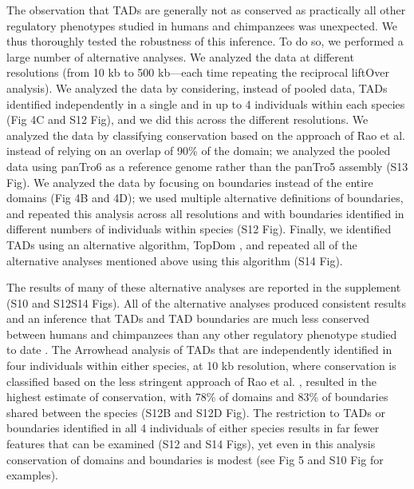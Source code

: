 The observation that TADs are generally not as conserved as practically all other regulatory phenotypes studied in humans and chimpanzees was unexpected. We thus thoroughly tested the robustness of this inference. To do so, we performed a large number of alternative analyses. We analyzed the data at different resolutions (from 10 kb to 500 kb---each time repeating the reciprocal liftOver analysis). We analyzed the data by considering, instead of pooled data, TADs identified independently in a single and in up to 4 individuals within each species (Fig 4C and S12 Fig), and we did this across the different resolutions. We analyzed the data by classifying conservation based on the approach of Rao et al. \cite{Rao.2014} instead of relying on an overlap of 90\% of the domain; we analyzed the pooled data using panTro6 as a reference genome rather than the panTro5 assembly (S13 Fig). We analyzed the data by focusing on boundaries instead of the entire domains (Fig 4B and 4D); we used multiple alternative definitions of boundaries, and repeated this analysis across all resolutions and with boundaries identified in different numbers of individuals within species (S12 Fig). Finally, we identified TADs using an alternative algorithm, TopDom \cite{Shin.2016}, and repeated all of the alternative analyses mentioned above using this algorithm (S14 Fig).

The results of many of these alternative analyses are reported in the supplement (S10 and S12{\textendash}S14 Figs). All of the alternative analyses produced consistent results and an inference that TADs and TAD boundaries are much less conserved between humans and chimpanzees than any other regulatory phenotype studied to date \cite{Pai.2011, Shulha.2012, Calarco.2007, Trizzino.2017, Prescott.2015, Kim.2011}. The Arrowhead analysis of TADs that are independently identified in four individuals within either species, at 10 kb resolution, where conservation is classified based on the less stringent approach of Rao et al. \cite{Rao.2014}, resulted in the highest estimate of conservation, with 78\% of domains and 83\% of boundaries shared between the species (S12B and S12D Fig). The restriction to TADs or boundaries identified in all 4 individuals of either species results in far fewer features that can be examined (S12 and S14 Figs), yet even in this analysis conservation of domains and boundaries is modest (see Fig 5 and S10 Fig for examples).

